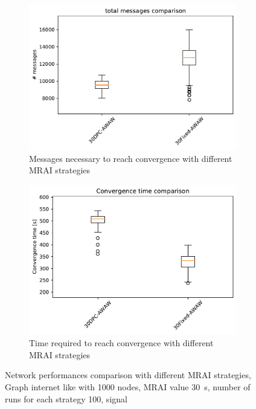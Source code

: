 \begin{figure}[h]
     \centering
     \begin{subfigure}[b]{0.49\textwidth}
         \centering
         \includegraphics[width=\textwidth]{images/internet_like/1000/comparison/comparison_AWAW_messages_boxplot.pdf}
		 \caption{Messages necessary to reach convergence with different
			 \ac{MRAI} strategies}
         \label{fig:boxplot_internet_like_1000_messages_AWAW}
     \end{subfigure}
     \hfill
     \begin{subfigure}[b]{0.49\textwidth}
         \centering
         \includegraphics[width=\textwidth]{images/internet_like/1000/comparison/comparison_AWAW_time_boxplot.pdf}
		 \caption{Time required to reach convergence with different \ac{MRAI}
			 strategies}
         \label{fig:boxplot_internet_like_1000_time_AWAW}
     \end{subfigure}
	 \caption{Network performances comparison with different \ac{MRAI} strategies,
		Graph internet like with \num{1000} nodes, \ac{MRAI} value
		\SI{30}{\second}, number of runs for each strategy \num{100}, signal }
        \label{fig:boxplot_internet_like_1000_AWAW}
\end{figure}

